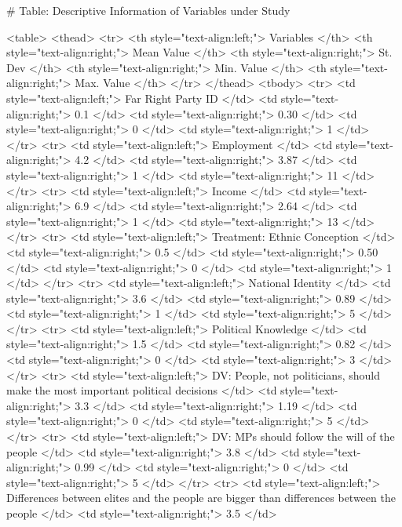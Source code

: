 # Table: Descriptive Information of Variables under Study 

<table>
 <thead>
  <tr>
   <th style="text-align:left;"> Variables </th>
   <th style="text-align:right;"> Mean Value </th>
   <th style="text-align:right;"> St. Dev </th>
   <th style="text-align:right;"> Min. Value </th>
   <th style="text-align:right;"> Max. Value </th>
  </tr>
 </thead>
<tbody>
  <tr>
   <td style="text-align:left;"> Far Right Party ID </td>
   <td style="text-align:right;"> 0.1 </td>
   <td style="text-align:right;"> 0.30 </td>
   <td style="text-align:right;"> 0 </td>
   <td style="text-align:right;"> 1 </td>
  </tr>
  <tr>
   <td style="text-align:left;"> Employment </td>
   <td style="text-align:right;"> 4.2 </td>
   <td style="text-align:right;"> 3.87 </td>
   <td style="text-align:right;"> 1 </td>
   <td style="text-align:right;"> 11 </td>
  </tr>
  <tr>
   <td style="text-align:left;"> Income </td>
   <td style="text-align:right;"> 6.9 </td>
   <td style="text-align:right;"> 2.64 </td>
   <td style="text-align:right;"> 1 </td>
   <td style="text-align:right;"> 13 </td>
  </tr>
  <tr>
   <td style="text-align:left;"> Treatment: Ethnic Conception </td>
   <td style="text-align:right;"> 0.5 </td>
   <td style="text-align:right;"> 0.50 </td>
   <td style="text-align:right;"> 0 </td>
   <td style="text-align:right;"> 1 </td>
  </tr>
  <tr>
   <td style="text-align:left;"> National Identity </td>
   <td style="text-align:right;"> 3.6 </td>
   <td style="text-align:right;"> 0.89 </td>
   <td style="text-align:right;"> 1 </td>
   <td style="text-align:right;"> 5 </td>
  </tr>
  <tr>
   <td style="text-align:left;"> Political Knowledge </td>
   <td style="text-align:right;"> 1.5 </td>
   <td style="text-align:right;"> 0.82 </td>
   <td style="text-align:right;"> 0 </td>
   <td style="text-align:right;"> 3 </td>
  </tr>
  <tr>
   <td style="text-align:left;"> DV: People, not politicians, 
 should make the most 
 important political decisions </td>
   <td style="text-align:right;"> 3.3 </td>
   <td style="text-align:right;"> 1.19 </td>
   <td style="text-align:right;"> 0 </td>
   <td style="text-align:right;"> 5 </td>
  </tr>
  <tr>
   <td style="text-align:left;"> DV: MPs should follow 
 the will of the people </td>
   <td style="text-align:right;"> 3.8 </td>
   <td style="text-align:right;"> 0.99 </td>
   <td style="text-align:right;"> 0 </td>
   <td style="text-align:right;"> 5 </td>
  </tr>
  <tr>
   <td style="text-align:left;"> Differences between elites and 
 the people are bigger than 
 differences between the people </td>
   <td style="text-align:right;"> 3.5 </td>
